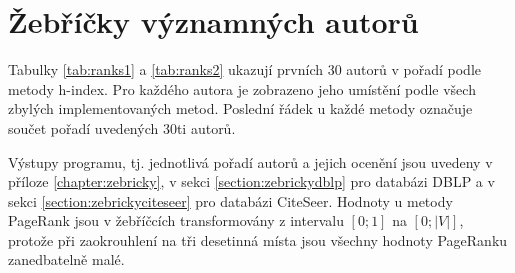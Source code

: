 \documentclass{bakalarka}
\begin{document}






\section{Žebříčky významných autorů}
Tabulky \ref{tab:ranks1} a \ref{tab:ranks2} ukazují prvních 30 autorů v pořadí
podle metody h-index. Pro každého autora je zobrazeno jeho umístění podle všech
zbylých implementovaných metod. Poslední řádek u každé metody označuje
součet pořadí uvedených 30ti autorů.



Výstupy programu, tj. jednotlivá pořadí autorů a jejich ocenění jsou uvedeny v
příloze \ref{chapter:zebricky}, v sekci \ref{section:zebrickydblp} pro databázi
DBLP a v sekci \ref{section:zebrickyciteseer} pro databázi CiteSeer.  Hodnoty u
metody PageRank jsou v žebříčcích transformovány z intervalu $[0; 1]$ na $[0;
|V|]$, protože při zaokrouhlení na tři desetinná místa jsou všechny hodnoty
PageRanku zanedbatelně malé.
\end{document}
